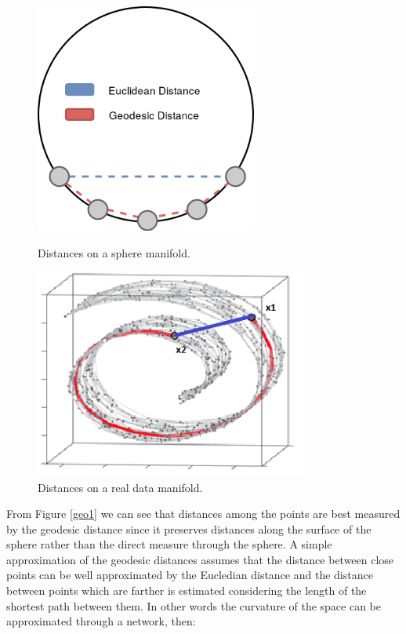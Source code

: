 \documentclass[11pt,a4paper]{article}
\begin{document}
\begin{figure}[H]
	\begin{minipage}[t]{0.5\linewidth}
		\centering
		\includegraphics[width=0.65\textwidth]{img/geodesic.png}
		\caption{Distances on a sphere manifold.}
		\label{geo1}
	\end{minipage}
	\hspace{0.1cm}
	\begin{minipage}[t]{0.5\linewidth} 
		\centering
		\includegraphics[width=0.8\textwidth]{img/geo2.png}
		\caption{Distances on a real data manifold.}
		\label{geo2}
	\end{minipage}        
\end{figure}
From Figure \ref{geo1} we can see that distances among the points are best measured by the geodesic distance since it preserves distances along the surface of the sphere rather than the direct measure through the sphere. A simple approximation of the geodesic distances assumes that the distance between close points can be well approximated by the Eucledian distance and the distance between points which are farther is estimated considering the length of the shortest path between them. In other words the curvature of the space can be approximated through a network, then:
\end{document}
